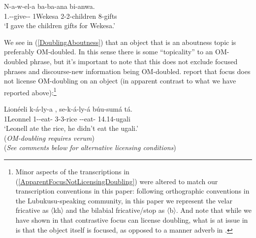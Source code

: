 \documentclass[output=paper]{langscibook}
\begin{document}

\label{DoublingAboutness}
\gll N-a-w-el-a  ba-ba-ana bi-anwa.  \\
1\Sg.\Sm-\Om-give-\Appl-\Fv{} 1Wekesa 2-2-children 8-gifts \\
\glt `I gave the children gifts for Wekesa.' 

\z 

We see in (\ref{DoublingAboutness}) that an object that is an aboutness topic is preferably OM-doubled. In this sense there is some ``topicality'' to an OM-doubled phrase, but it's important to note that this does not exclude focused phrases and discourse-new information being OM-doubled. \citet{SikukuEtAl:2018:LubukusuOM} report that focus does not license OM-doubling on an object (in apparent contrast to what we have reported above):\footnote{Minor aspects of the transcriptions in (\ref{ApparentFocusNotLicensingDoubling}) were altered to match our transcription conventions in this paper: following orthographic conventions in the Lubukusu-speaking community, in this paper we represent the velar fricative as 〈kh〉 and the bilabial fricative/stop as 〈b〉. And note that while we have shown in  that contrastive focus can license doubling, what is at issue in  is that the object itself is focused, as opposed to a manner adverb in .} 

\ea \label{ApparentFocusNotLicensingDoubling}
\gll Lionéeli k-á-ly-a , se-k-á-ly-á búu-sumá tá. \\
1Leonnel 1\Sm-\Om-eat-\Fv{} 3-3-rice \Sm-\Pst-eat-\Fv{} 14.14-ugali \Neg{} \\
\glt `Leonell ate the rice, he didn’t eat the ugali.’  \citep[376]{SikukuEtAl:2018:LubukusuOM} \\ (\textit{OM-doubling requires verum}) \\
(\textit{See comments below for alternative licensing conditions})

\z 
\end{document}
